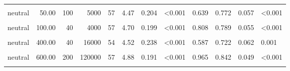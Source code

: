 \documentclass[
]{article}
\begin{document}
\begin{longtable}[t]{lrrrrrrlrrrl}
\hspace{1em}\cellcolor{gray!10}{neutral} & \cellcolor{gray!10}{50.00} & \cellcolor{gray!10}{10} & \cellcolor{gray!10}{500} & \cellcolor{gray!10}{54} & \cellcolor{gray!10}{4.17} & \cellcolor{gray!10}{0.205} & \cellcolor{gray!10}{0.002} & \cellcolor{gray!10}{0.448} & \cellcolor{gray!10}{0.759} & \cellcolor{gray!10}{0.059} & \cellcolor{gray!10}{<0.001}\\
\hspace{1em}neutral & 50.00 & 100 & 5000 & 57 & 4.47 & 0.204 & <0.001 & 0.639 & 0.772 & 0.057 & <0.001\\
\hspace{1em}\cellcolor{gray!10}{neutral} & \cellcolor{gray!10}{100.00} & \cellcolor{gray!10}{30} & \cellcolor{gray!10}{3000} & \cellcolor{gray!10}{54} & \cellcolor{gray!10}{4.04} & \cellcolor{gray!10}{0.217} & \cellcolor{gray!10}{0.017} & \cellcolor{gray!10}{0.340} & \cellcolor{gray!10}{0.667} & \cellcolor{gray!10}{0.065} & \cellcolor{gray!10}{0.020}\\
\hspace{1em}neutral & 100.00 & 40 & 4000 & 57 & 4.70 & 0.199 & <0.001 & 0.808 & 0.789 & 0.055 & <0.001\\
\hspace{1em}\cellcolor{gray!10}{neutral} & \cellcolor{gray!10}{400.00} & \cellcolor{gray!10}{10} & \cellcolor{gray!10}{4000} & \cellcolor{gray!10}{57} & \cellcolor{gray!10}{5.04} & \cellcolor{gray!10}{0.173} & \cellcolor{gray!10}{<0.001} & \cellcolor{gray!10}{1.185} & \cellcolor{gray!10}{0.912} & \cellcolor{gray!10}{0.038} & \cellcolor{gray!10}{<0.001}\\
\hspace{1em}neutral & 400.00 & 40 & 16000 & 54 & 4.52 & 0.238 & <0.001 & 0.587 & 0.722 & 0.062 & 0.001\\
\hspace{1em}\cellcolor{gray!10}{neutral} & \cellcolor{gray!10}{600.00} & \cellcolor{gray!10}{20} & \cellcolor{gray!10}{12000} & \cellcolor{gray!10}{54} & \cellcolor{gray!10}{4.44} & \cellcolor{gray!10}{0.234} & \cellcolor{gray!10}{<0.001} & \cellcolor{gray!10}{0.555} & \cellcolor{gray!10}{0.778} & \cellcolor{gray!10}{0.058} & \cellcolor{gray!10}{<0.001}\\
\hspace{1em}neutral & 600.00 & 200 & 120000 & 57 & 4.88 & 0.191 & <0.001 & 0.965 & 0.842 & 0.049 & <0.001\\
\hspace{1em}\cellcolor{gray!10}{neutral} & \cellcolor{gray!10}{800.00} & \cellcolor{gray!10}{30} & \cellcolor{gray!10}{24000} & \cellcolor{gray!10}{57} & \cellcolor{gray!10}{5.02} & \cellcolor{gray!10}{0.186} & \cellcolor{gray!10}{<0.001} & \cellcolor{gray!10}{1.088} & \cellcolor{gray!10}{0.895} & \cellcolor{gray!10}{0.041} & \cellcolor{gray!10}{<0.001}\\

\end{longtable}
\end{document}
